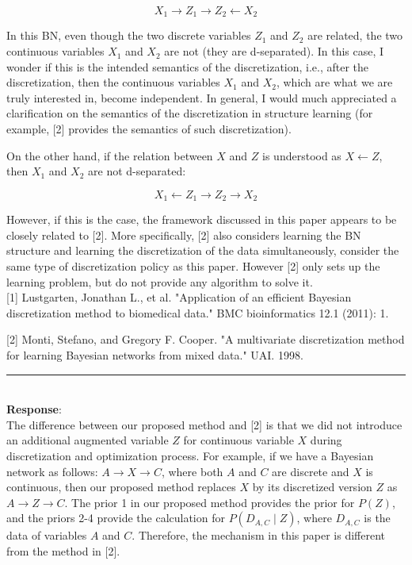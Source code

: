 \documentclass{article}
\begin{document}
$$X_1 \rightarrow Z_1 \rightarrow Z_2 \leftarrow X_2$$


In this BN, even though the two discrete variables $Z_1$ and $Z_2$ are related, the two continuous variables $X_1$ and $X_2$ are not (they are d-separated). In this case, I wonder if this is the intended semantics of the discretization, i.e., after the discretization, then the continuous variables $X_1$ and $X_2$, which are what we are truly interested in, become independent. In general, I would much appreciated a clarification on the semantics of the discretization in structure learning (for example, [2] provides the semantics of such discretization).

On the other hand, if the relation between $X$ and $Z$ is understood as $X \leftarrow Z$, then $X_1$ and $X_2$ are not d-separated:

$$X_1 \leftarrow Z_1 \rightarrow Z_2 \rightarrow X_2$$

However, if this is the case, the framework discussed in this paper appears to be closely related to [2]. More specifically, [2] also considers learning the BN structure and learning the discretization of the data simultaneously, consider the same type of discretization policy as this paper. However [2] only sets up the learning problem, but do not provide any algorithm to solve it.\\

[1] Lustgarten, Jonathan L., et al. "Application of an efficient Bayesian discretization method to biomedical data." BMC bioinformatics 12.1 (2011): 1.

[2] Monti, Stefano, and Gregory F. Cooper. "A multivariate discretization method for learning Bayesian networks from mixed data." UAI. 1998.

\noindent\rule{8cm}{0.4pt}\\
{\bf Response}:\\

The difference between our proposed method and [2] is that we did not introduce an additional augmented variable $Z$ for continuous variable $X$ during discretization and optimization process.
For example, if we have a Bayesian network as follows: $A \rightarrow X \rightarrow C$, where both $A$ and $C$ are discrete and $X$ is continuous, then our proposed method replaces $X$ by its discretized version $Z$ as $A \rightarrow Z \rightarrow C$.
The prior 1 in our proposed method provides the prior for $P(Z)$, and the priors 2-4 provide the calculation for $P(D_{A,C} \mid Z)$, where $D_{A,C}$ is the data of variables $A$ and $C$.
Therefore, the mechanism in this paper is different from the method in [2].
\end{document}
